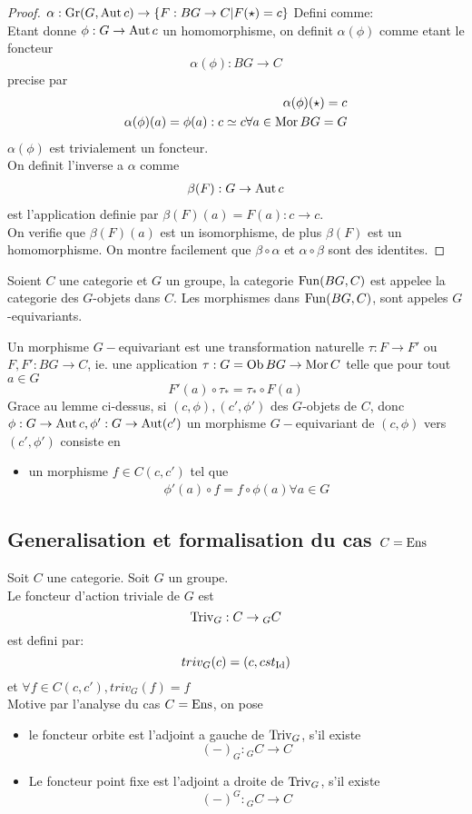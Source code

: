 \documentclass[../main.tex]{subfiles}
\begin{document}
\begin{proof}
$\alpha: \operatorname{Gr}( G,\operatorname{Aut} c) \to \left\{ F:BG\to C| F( \star) =c \right\} $ 
Defini comme:\\
Etant donne $\phi: G\to \operatorname{Aut} c$ un homomorphisme, on definit $\alpha( \phi) $ comme etant le foncteur 
\[ 
\alpha( \phi) :BG\to C
\]
precise par 
\begin{align*}
\alpha( \phi) ( \star) =c\\
\alpha( \phi) ( a) =\phi( a) :c\simeq c \forall a \in \operatorname{Mor} BG= G
\end{align*}
$\alpha( \phi) $ est trivialement un foncteur.\\
\hr
On definit l'inverse a $\alpha$ comme
\begin{align*}
\beta( F) : G\to \operatorname{Aut} c
\end{align*}
est l'application definie par $\beta( F) ( a) = F( a): c\to c $.\\
On verifie que $\beta( F)( a)  $ est un isomorphisme, de plus $\beta( F)  $ est un homomorphisme.
On montre facilement que $\beta\circ\alpha$ et $\alpha\circ\beta$ sont des identites.
\end{proof}
\begin{defn}
Soient $C$ une categorie et $G$ un groupe, la categorie $\operatorname{Fun} ( BG,C)$ est appelee la categorie des $G$-objets dans $C$. Les morphismes dans $\operatorname{Fun} ( BG,C) $, sont appeles $G$-equivariants.
\end{defn}
Un morphisme $G-$equivariant est une transformation naturelle $\tau: F\to F'$ ou $F,F': BG\to C$, ie. une application $\tau: G= \operatorname{Ob} BG\to \operatorname{Mor} C$ telle que pour tout $a\in G$ 
\[ 
F'( a) \circ\tau_* = \tau_*\circ F( a) 
\]
Grace au lemme ci-dessus, si $( c,\phi) , ( c',\phi') $ des $G$-objets de $C$, donc $\phi: G \to \operatorname{Aut} c, \phi':G\to \operatorname{Aut}( c') $ un morphisme $G-$equivariant de $( c,\phi) $ vers $( c',\phi') $ consiste en
\begin{itemize}
\item un morphisme $f\in C( c,c') $ tel que
	\begin{align*}
	\phi'( a) \circ f = f\circ \phi( a) \forall a \in G
	\end{align*}
\end{itemize}
\subsection{Generalisation et formalisation du cas $C= \operatorname{Ens}$ }
Soit $C$ une categorie. Soit $G$ un groupe.\\
Le foncteur d'action triviale de $G$ est 
\[ 
\operatorname{Triv}_G : C \to  { }_{G} { C }
\]
est defini par:
\[ 
triv_G( c) = ( c,cst_{ \operatorname{Id} } )
\]
et $\forall f \in C( c,c') , triv_G( f) = f$ 	\\
Motive par l'analyse du cas $C= \operatorname{Ens}$, on pose 
\begin{itemize}
\item le foncteur orbite est l'adjoint a gauche de $\operatorname{Triv}_G$, s'il existe
	\[ 
		( -) _G: { } _G C\to C
	\]

\item Le foncteur point fixe est l'adjoint a droite de $\operatorname{Triv}_G$, s'il existe
	\[ 
		( -)^{G}: { } _G C \to C
	\]
\end{itemize}
\end{document}

